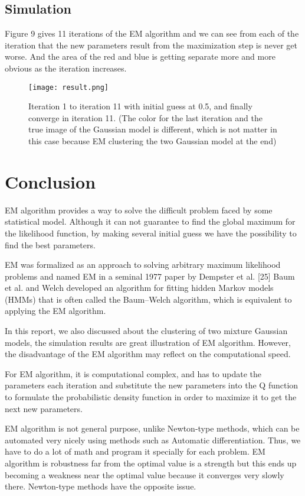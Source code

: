 \documentclass[onecolumn,12pt]{IEEEtran}
\begin{document}
\subsection{Simulation}
Figure 9 gives 11 iterations of the EM algorithm and we can see from each of the iteration that the new parameters result from the maximization step is never get worse. And the area of the red and blue is getting separate more and more obvious as the iteration increases.

\begin{figure}[!htb]
  \centering
  \texttt{[image: result.png]}
  \caption{Iteration 1 to iteration 11 with initial guess at 0.5, and finally converge in iteration 11. (The color for the last iteration and the true image of the Gaussian model is different, which is not matter in this case because EM clustering the two Gaussian model at the end)}
\end{figure}


\section{Conclusion}

EM algorithm provides a way to solve the difficult problem faced by some statistical model. Although it can not guarantee to find the global maximum for the likelihood function, by making several initial guess we have the possibility to find the best parameters.

EM was formalized as an approach to solving arbitrary maximum likelihood problems and named EM in a seminal 1977 paper by Dempster et al. [25] Baum et al. and Welch developed an algorithm for fitting hidden Markov models (HMMs) that is often called the Baum–Welch algorithm, which is equivalent to applying the EM algorithm. 

In this report, we also discussed about the clustering of two mixture Gaussian models, the simulation results are great illustration of EM algorithm. However, the disadvantage of the EM algorithm may reflect on the computational speed. 

For EM algorithm, it is computational complex, and has to update the parameters each iteration and substitute the new parameters into the Q function to formulate the probabilistic density function in order to maximize it to get the next new parameters.

EM algorithm is not general purpose, unlike Newton-type methods, which can be automated very nicely using methods such as Automatic differentiation. Thus, we have to do a lot of math and program it specially for each problem.  EM algorithm is robustness far from the optimal value is a strength but this ends up becoming a weakness near the optimal value because it converges very slowly there. Newton-type methods have the opposite issue.
\end{document}
